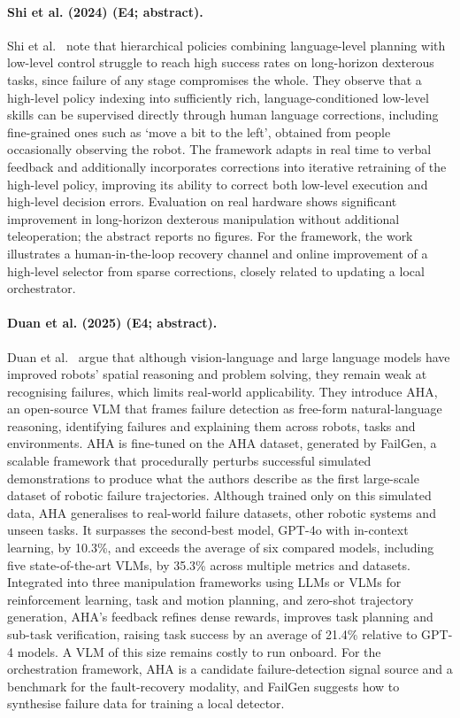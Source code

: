 \documentclass[10pt,a4paper]{article}
\begin{document}
\paragraph{Shi et al. (2024) (E4; abstract).} Shi et al.~\cite{Shi2024} note that hierarchical policies combining language-level planning with low-level control struggle to reach high success rates on long-horizon dexterous tasks, since failure of any stage compromises the whole. They observe that a high-level policy indexing into sufficiently rich, language-conditioned low-level skills can be supervised directly through human language corrections, including fine-grained ones such as `move a bit to the left', obtained from people occasionally observing the robot. The framework adapts in real time to verbal feedback and additionally incorporates corrections into iterative retraining of the high-level policy, improving its ability to correct both low-level execution and high-level decision errors. Evaluation on real hardware shows significant improvement in long-horizon dexterous manipulation without additional teleoperation; the abstract reports no figures. For the framework, the work illustrates a human-in-the-loop recovery channel and online improvement of a high-level selector from sparse corrections, closely related to updating a local orchestrator.

\paragraph{Duan et al. (2025) (E4; abstract).} Duan et al.~\cite{Duan2025} argue that although vision-language and large language models have improved robots' spatial reasoning and problem solving, they remain weak at recognising failures, which limits real-world applicability. They introduce AHA, an open-source VLM that frames failure detection as free-form natural-language reasoning, identifying failures and explaining them across robots, tasks and environments. AHA is fine-tuned on the AHA dataset, generated by FailGen, a scalable framework that procedurally perturbs successful simulated demonstrations to produce what the authors describe as the first large-scale dataset of robotic failure trajectories. Although trained only on this simulated data, AHA generalises to real-world failure datasets, other robotic systems and unseen tasks. It surpasses the second-best model, GPT-4o with in-context learning, by 10.3\%, and exceeds the average of six compared models, including five state-of-the-art VLMs, by 35.3\% across multiple metrics and datasets. Integrated into three manipulation frameworks using LLMs or VLMs for reinforcement learning, task and motion planning, and zero-shot trajectory generation, AHA's feedback refines dense rewards, improves task planning and sub-task verification, raising task success by an average of 21.4\% relative to GPT-4 models. A VLM of this size remains costly to run onboard. For the orchestration framework, AHA is a candidate failure-detection signal source and a benchmark for the fault-recovery modality, and FailGen suggests how to synthesise failure data for training a local detector.
\end{document}
